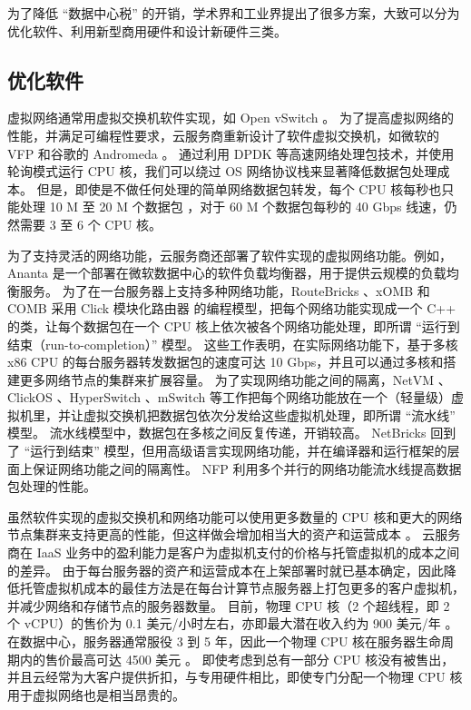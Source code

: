 为了降低 ``数据中心税'' 的开销，学术界和工业界提出了很多方案，大致可以分为优化软件、利用新型商用硬件和设计新硬件三类。

\subsection{优化软件}

虚拟网络通常用虚拟交换机软件实现，如 Open vSwitch \cite{pfaff2015design}。
为了提高虚拟网络的性能，并满足可编程性要求，云服务商重新设计了软件虚拟交换机，如微软的 VFP \cite{firestone2017vfp} 和谷歌的 Andromeda \cite{andromeda}。
通过利用 DPDK \cite{dpdk} 等高速网络处理包技术，并使用轮询模式运行 CPU 核，我们可以绕过 OS 网络协议栈来显著降低数据包处理成本。
但是，即使是不做任何处理的简单网络数据包转发，每个 CPU 核每秒也只能处理 10 M 至 20 M 个数据包 \cite{martins2014clickos,netbricks}，对于 60 M 个数据包每秒的 40 Gbps 线速，仍然需要 3 至 6 个 CPU 核。

为了支持灵活的网络功能，云服务商还部署了软件实现的虚拟网络功能。例如，Ananta \cite {ananta} 是一个部署在微软数据中心的软件负载均衡器，用于提供云规模的负载均衡服务。
为了在一台服务器上支持多种网络功能，RouteBricks \cite {routebricks}、xOMB \cite{anderson2012xomb} 和 COMB \cite{comb} 采用 Click 模块化路由器 \cite{kohler2000click} 的编程模型，把每个网络功能实现成一个 C++ 的类，让每个数据包在一个 CPU 核上依次被各个网络功能处理，即所谓 ``运行到结束（run-to-completion）'' 模型。
这些工作表明，在实际网络功能下，基于多核 x86 CPU 的每台服务器转发数据包的速度可达 10 Gbps，并且可以通过多核和搭建更多网络节点的集群来扩展容量。
为了实现网络功能之间的隔离，NetVM \cite{hwang2015netvm}、ClickOS \cite{martins2014clickos}、HyperSwitch \cite{ram2013hyper}、mSwitch \cite{eisenbud2016maglev} 等工作把每个网络功能放在一个（轻量级）虚拟机里，并让虚拟交换机把数据包依次分发给这些虚拟机处理，即所谓 ``流水线'' 模型。
流水线模型中，数据包在多核之间反复传递，开销较高。
NetBricks \cite{netbricks} 回到了 ``运行到结束'' 模型，但用高级语言实现网络功能，并在编译器和运行框架的层面上保证网络功能之间的隔离性。
NFP \cite{sun2017nfp} 利用多个并行的网络功能流水线提高数据包处理的性能。

虽然软件实现的虚拟交换机和网络功能可以使用更多数量的 CPU 核和更大的网络节点集群来支持更高的性能，但这样做会增加相当大的资产和运营成本 \cite {ananta,duet}。
云服务商在 IaaS 业务中的盈利能力是客户为虚拟机支付的价格与托管虚拟机的成本之间的差异。
由于每台服务器的资产和运营成本在上架部署时就已基本确定，因此降低托管虚拟机成本的最佳方法是在每台计算节点服务器上打包更多的客户虚拟机，并减少网络和存储节点的服务器数量。
目前，物理 CPU 核（2 个超线程，即 2 个 vCPU）的售价为 0.1 美元/小时左右，亦即最大潜在收入约为 900 美元/年 \cite{smartnic}。
在数据中心，服务器通常服役 3 到 5 年，因此一个物理 CPU 核在服务器生命周期内的售价最高可达 4500 美元 \cite{smartnic}。
即使考虑到总有一部分 CPU 核没有被售出，并且云经常为大客户提供折扣，与专用硬件相比，即使专门分配一个物理 CPU 核用于虚拟网络也是相当昂贵的。


